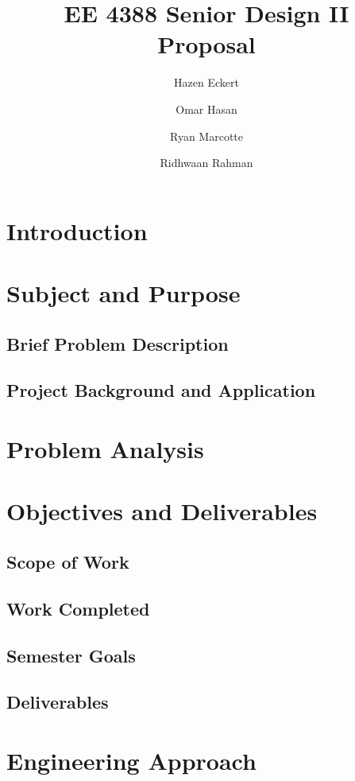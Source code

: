 \documentclass[letterpaper,12pt]{report}
\begin{document}
\title{EE 4388 Senior Design II\\Proposal}
\author{Hazen Eckert \and Omar Hasan \and Ryan Marcotte \and Ridhwaan Rahman}
\maketitle
\newpage

\section{Introduction}

\section{Subject and Purpose}
\subsection{Brief Problem Description}
\subsection{Project Background and Application}

\section{Problem Analysis}
\section{Objectives and Deliverables}
\subsection{Scope of Work}
\subsection{Work Completed}
\subsection{Semester Goals}
\subsection{Deliverables}

\section{Engineering Approach}
\end{document}
